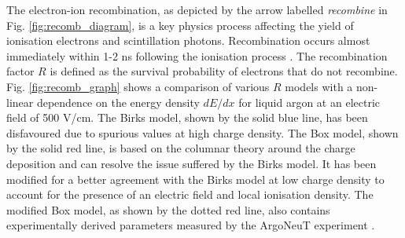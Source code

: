 The electron-ion recombination, as depicted by the arrow labelled \textit{recombine} in Fig. \ref{fig:recomb_diagram}, is a key physics process affecting the yield of ionisation electrons and scintillation photons.
Recombination occurs almost immediately within 1-2 ns following the ionisation process \cite{argoneut_recomb}.             
The recombination factor $R$ is defined as the survival probability of electrons that do not recombine.
Fig. \ref{fig:recomb_graph} shows a comparison of various $R$ models with a non-linear dependence on the energy density $dE/dx$ for liquid argon at an electric field of 500 V/cm.
The Birks model, shown by the solid blue line, has been disfavoured due to spurious values at high charge density.
The Box model, shown by the solid red line, is based on the columnar theory around the charge deposition and can resolve the issue suffered by the Birks model.
It has been modified for a better agreement with the Birks model at low charge density to account for the presence of an electric field and local ionisation density.
The modified Box model, as shown by the dotted red line, also contains experimentally derived parameters measured by the ArgoNeuT experiment \cite{argoneut_recomb}.



